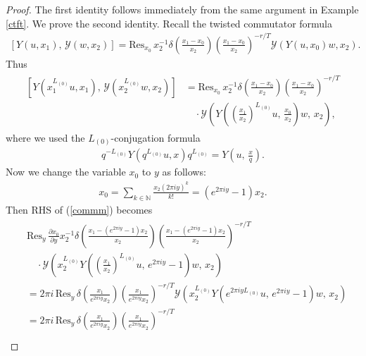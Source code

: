 \documentclass[9pt]{amsart}
\begin{document}
\begin{proof}
The first identity follows immediately from the same argument in Example \ref{ctft}.
We prove the second identity. Recall the twisted commutator formula
\begin{align*}
    \left[Y(u,x_{1}),\, \mathcal{Y}(w,x_{2})\right]
    =\text{Res}_{x_{0}}\, x_{2}^{-1}\delta\left(\frac{x_{1}-x_{0}}{x_{2}}\right)\left(\frac{x_{1}-x_{0}}{x_{2}}\right)^{-r/T}\mathcal{Y}(Y(u,x_{0})w,x_{2}).
\end{align*}
Thus
\begin{align}\label{commm}
\begin{split}
    \left[Y\left(x_{1}^{L_{(0)}}u,x_{1}\right),\, \mathcal{Y}\left(x_{2}^{L_{(0)}}w,x_{2}\right)\right]
    &=\text{Res}_{x_{0}}\, x_{2}^{-1}\delta\left(\frac{x_{1}-x_{0}}{x_{2}}\right)\left(\frac{x_{1}-x_{0}}{x_{2}}\right)^{-r/T} \\
    &\quad\cdot \mathcal{Y}\left(Y\left(\left(\frac{x_{1}}{x_{2}}\right)^{L_{(0)}}u,\, \frac{x_{0}}{x_{2}}\right)w,\, x_{2}\right),
\end{split}
\end{align}
where we used the $L_{(0)}$-conjugation formula
\begin{align}\label{l0conjugatin}
q^{-L_{(0)}}Y(q^{L_{(0)}}u,x)q^{L_{(0)}}=Y\left(u,\, \frac{x}{q}\right).
\end{align}
Now we change the variable $x_{0}$ to $y$ as follows:
\begin{align*}
    x_{0}=\sum_{k\in \mathbb{N}} \frac{x_{2}(2\pi i y)^{k}}{k!}=(e^{2\pi i y}-1)x_{2}.
\end{align*}
Then RHS of (\ref{commm}) becomes
\begin{align}\label{gotcf1}
\begin{split}
       & \text{Res}_{y}\, \frac{\partial x_{0}}{\partial y} x_{2}^{-1} \delta\left(\frac{x_{1}-(e^{2\pi i y}-1)x_{2}}{x_{2}}\right)\left(\frac{x_{1}-(e^{2\pi i y}-1)x_{2}}{x_{2}}\right)^{-r/T} \\
       &\quad\cdot \mathcal{Y}\left(x_{2}^{L_{(0)}}Y\left(\left(\frac{x_{1}}{x_{2}}\right)^{L_{(0)}}u,\, e^{2\pi i y}-1\right)w,\, x_{2}\right) \\
       &= 2\pi i\, \text{Res}_{y}\, \delta\left(\frac{x_{1}}{e^{2\pi i y}x_{2}}\right)\left(\frac{x_{1}}{e^{2\pi i y}x_{2}}\right)^{-r/T}
       \mathcal{Y}\left(x_{2}^{L_{(0)}}Y\left(e^{2\pi i y L_{(0)}}u,\, e^{2\pi i y}-1\right)w,\, x_{2}\right) \\
       &= 2\pi i\, \text{Res}_{y}\, \delta\left(\frac{x_{1}}{e^{2\pi i y}x_{2}}\right)\left(\frac{x_{1}}{e^{2\pi i y}x_{2}}\right)^{-r/T} \\

\end{split}
\end{align}
\end{proof}
\end{document}
